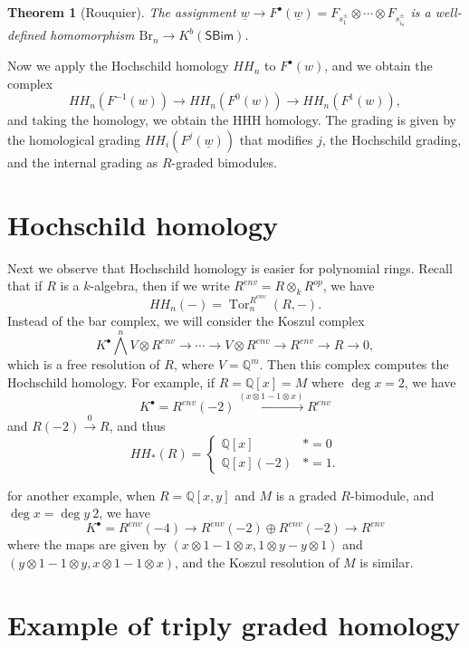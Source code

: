 \documentclass[leqno, openany]{memoir}
\newtheorem{thm}{Theorem}[section]
\theoremstyle{definition}
\theoremstyle{remark}
\theoremstyle{plain}
\theoremstyle{definition}
\theoremstyle{remark}
\newcommand{\Q}{\mathbb{Q}}
\newcommand{\mr}[1]{\mathrm{#1}}
\newcommand{\ms}[1]{\mathsf{#1}}
\newcommand{\ul}[1]{\underline{#1}}
\newcommand{\1}{\mathbf{1}}
\newcommand{\2}{\mathbf{2}}
\newcommand{\3}{\mathbf{3}}
\DeclareMathOperator{\Tor}{Tor}
\begin{document}
\begin{thm}[Rouquier]
    The assignment $\ul{w} \to F^{\bullet}(\ul{w}) = F_{s_1^{\pm}} \otimes \cdots \otimes F_{s_{i_n}^{\pm}}$ is a well-defined homomorphism $\mr{Br}_n \to K^{b}(\ms{SBim})$.
\end{thm}

Now we apply the Hochschild homology $HH_n$ to $F^{\bullet}(w)$, and we obtain the complex
\[ HH_n(F^{-1}(w)) \to HH_n(F^0(w)) \to HH_n(F^1(w)), \]
and taking the homology, we obtain the HHH homology. The grading is given by the homological grading $HH_i(F^j(\ul{w}))$ that modifies $j$, the Hochschild grading, and the internal grading as $R$-graded bimodules.

\section{Hochschild homology}%
\label{sec:hochschild_homology}

Next we observe that Hochschild homology is easier for polynomial rings. Recall that if $R$ is a $k$-algebra, then if we write $R^{env} = R \otimes_k R^{op}$, we have
\[ HH_n(-) = \Tor_n^{R^{env}}(R,-). \]
Instead of the bar complex, we will consider the Koszul complex
\[ K^{\bullet} \bigwedge^n V \otimes R^{env} \to \cdots \to V \otimes R^{env} \to R^{env} \to R \to 0, \]
which is a free resolution of $R$, where $V = \Q^m$. Then this complex computes the Hochschild homology. For example, if $R = \Q[x] = M$ where $\deg x = 2$, we have
\[ K^{\bullet} = R^{env}(-2) \xrightarrow{(x \otimes 1 - 1 \otimes x)} R^{env} \] and $R(-2) \xrightarrow{0} R$, and thus
\[ HH_*(R) = \begin{cases}
    \Q[x] & * = 0 \\ 
    \Q[x](-2) & * = 1.
\end{cases}
\]

for another example, when $R = \Q[x,y]$ and $M$ is a graded $R$-bimodule, and $\deg x = \deg y \ 2$, we have
\[ K^{\bullet} = R^{env}(-4) \to R^{env}(-2) \oplus R^{env}(-2) \to R^{env} \]
where the maps are given by $(x \otimes 1 - 1 \otimes x, 1 \otimes y - y \otimes 1)$ and $(y \otimes 1 - 1 \otimes y, x \otimes 1 - 1 \otimes x)$, and the Koszul resolution of $M$ is similar.

\section{Example of triply graded homology}%
\label{sec:example_of_triply_graded_homology}
\end{document}
